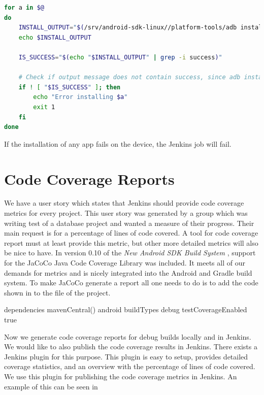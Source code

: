 \begin{lstlisting}[language=bash,showstringspaces=false,caption=Script that installs the given APKs to an Android device,label=lst:install_apks_on_android_device]
for a in $@
do
    INSTALL_OUTPUT="$(/srv/android-sdk-linux//platform-tools/adb install $a)"
    echo $INSTALL_OUTPUT

    IS_SUCCESS="$(echo "$INSTALL_OUTPUT" | grep -i success)"

    # Check if output message does not contain success, since adb install does not provide exit code != 0 at failure
    if ! [ "$IS_SUCCESS" ]; then
        echo "Error installing $a"
        exit 1
    fi
done
\end{lstlisting}

If the installation of any app fails on the device, the Jenkins job will fail.

\section{Code Coverage Reports}\label{sec:s3_linecoverage}
We have a user story which states that Jenkins should provide code coverage metrics for every project. This user story was generated by a group which was writing test of a database project and wanted a measure of their progress. Their main request is for a percentage of lines of code covered. A tool for code coverage report must at least provide this metric, but other more detailed metrics will also be nice to have. In version 0.10 of the \emph{New Android SDK Build System} \parencite{new-build-android}, support for the JaCoCo \parencite{jacoco-home} Java Code Coverage Library was included. It meets all of our demands for metrics and is nicely integrated into the Android and Gradle build system. To make JaCoCo generate a report all one needs to do is to add the code shown in  to the  file of the project.

\begin{gradlecode}[caption=Gradle script for enabling JaCoCo,label=lst:Jacoco]
dependencies {
    mavenCentral()
}
android {
    buildTypes {
        debug {
            testCoverageEnabled true
        }
    }
}
\end{gradlecode}{}

Now we generate code coverage reports for debug builds locally and in Jenkins. We would like to also publish the code coverage results in Jenkins. There exists a Jenkins plugin \parencite{jacoco-jenkins-plugin} for this purpose. This plugin is easy to setup, provides detailed coverage statistics, and an overview with the percentage of lines of code covered. We use this plugin for publishing the code coverage metrics in Jenkins. An example of this can be seen in 

